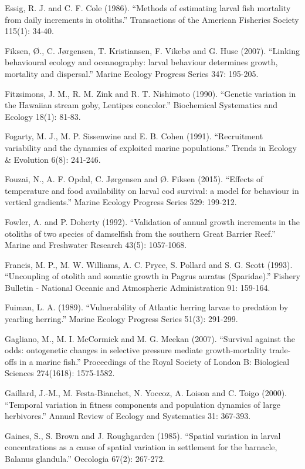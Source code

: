\documentclass[]{book}
\begin{document}
Essig, R. J. and C. F. Cole (1986). ``Methods of estimating larval fish
mortality from daily increments in otoliths.'' Transactions of the
American Fisheries Society 115(1): 34-40.

Fiksen, Ø., C. Jørgensen, T. Kristiansen, F. Vikebø and G. Huse (2007).
``Linking behavioural ecology and oceanography: larval behaviour
determines growth, mortality and dispersal.'' Marine Ecology Progress
Series 347: 195-205.

Fitzsimons, J. M., R. M. Zink and R. T. Nishimoto (1990). ``Genetic
variation in the Hawaiian stream goby, Lentipes concolor.'' Biochemical
Systematics and Ecology 18(1): 81-83.

Fogarty, M. J., M. P. Sissenwine and E. B. Cohen (1991). ``Recruitment
variability and the dynamics of exploited marine populations.'' Trends
in Ecology \& Evolution 6(8): 241-246.

Fouzai, N., A. F. Opdal, C. Jørgensen and Ø. Fiksen (2015). ``Effects of
temperature and food availability on larval cod survival: a model for
behaviour in vertical gradients.'' Marine Ecology Progress Series 529:
199-212.

Fowler, A. and P. Doherty (1992). ``Validation of annual growth
increments in the otoliths of two species of damselfish from the
southern Great Barrier Reef.'' Marine and Freshwater Research 43(5):
1057-1068.

Francis, M. P., M. W. Williams, A. C. Pryce, S. Pollard and S. G. Scott
(1993). ``Uncoupling of otolith and somatic growth in Pagrus auratus
(Sparidae).'' Fishery Bulletin - National Oceanic and Atmospheric
Administration 91: 159-164.

Fuiman, L. A. (1989). ``Vulnerability of Atlantic herring larvae to
predation by yearling herring.'' Marine Ecology Progress Series 51(3):
291-299.

Gagliano, M., M. I. McCormick and M. G. Meekan (2007). ``Survival
against the odds: ontogenetic changes in selective pressure mediate
growth-mortality trade-offs in a marine fish.'' Proceedings of the Royal
Society of London B: Biological Sciences 274(1618): 1575-1582.

Gaillard, J.-M., M. Festa-Bianchet, N. Yoccoz, A. Loison and C. Toigo
(2000). ``Temporal variation in fitness components and population
dynamics of large herbivores.'' Annual Review of Ecology and Systematics
31: 367-393.

Gaines, S., S. Brown and J. Roughgarden (1985). ``Spatial variation in
larval concentrations as a cause of spatial variation in settlement for
the barnacle, Balanus glandula.'' Oecologia 67(2): 267-272.
\end{document}
